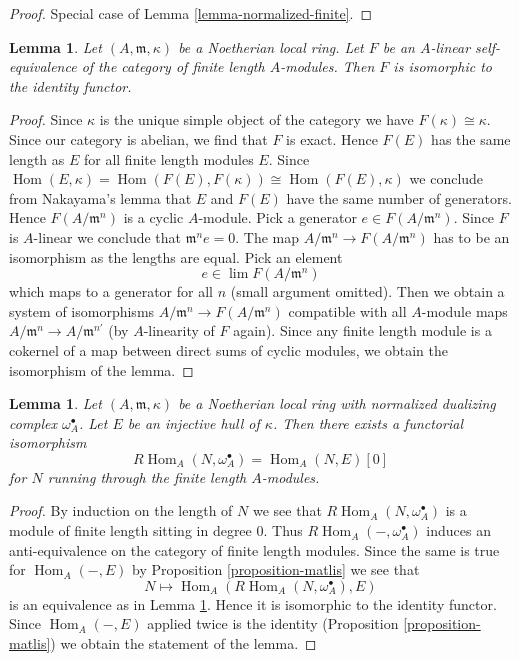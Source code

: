 \documentclass{stacks-project}
\theoremstyle{plain}
\newtheorem{lemma}[subsection]{Lemma}
\theoremstyle{definition}
\theoremstyle{remark}
\numberwithin{equation}{subsection}
\def\lim{\mathop{\mathrm{lim}}\nolimits}
\def\Hom{\mathop{\mathrm{Hom}}\nolimits}
\begin{document}
\begin{proof}
Special case of Lemma \ref{lemma-normalized-finite}.
\end{proof}

\begin{lemma}
\label{lemma-equivalence-finite-length}
Let $(A, \mathfrak m, \kappa)$ be a Noetherian local
ring. Let $F$ be an $A$-linear self-equivalence of the category of
finite length $A$-modules. Then $F$ is isomorphic to the identity functor.
\end{lemma}

\begin{proof}
Since $\kappa$ is the unique simple object of the category we have
$F(\kappa) \cong \kappa$. Since our category is abelian, we find that
$F$ is exact. Hence $F(E)$ has the same length as $E$ for all finite
length modules $E$.
Since $\Hom(E, \kappa) = \Hom(F(E), F(\kappa)) \cong \Hom(F(E), \kappa)$
we conclude from Nakayama's lemma that $E$ and $F(E)$ have the same
number of generators. Hence $F(A/\mathfrak m^n)$ is a cyclic $A$-module.
Pick a generator $e \in F(A/\mathfrak m^n)$.
Since $F$ is $A$-linear we conclude that $\mathfrak m^n e = 0$.
The map $A/\mathfrak m^n \to F(A/\mathfrak m^n)$ has to be
an isomorphism as the lengths are equal. Pick an element
$$
e \in \lim F(A/\mathfrak m^n)
$$
which maps to a generator for all $n$ (small argument omitted).
Then we obtain a system of isomorphisms
$A/\mathfrak m^n \to F(A/\mathfrak m^n)$ compatible with all
$A$-module maps $A/\mathfrak m^n \to A/\mathfrak m^{n'}$ (by $A$-linearity
of $F$ again). Since any finite length module is a cokernel
of a map between direct sums of cyclic modules, we obtain the isomorphism
of the lemma.
\end{proof}

\begin{lemma}
\label{lemma-dualizing-finite-length}
Let $(A, \mathfrak m, \kappa)$ be a Noetherian local
ring with normalized dualizing complex $\omega_A^\bullet$.
Let $E$ be an injective hull of $\kappa$. Then there exists
a functorial isomorphism
$$
R\Hom_A(N, \omega_A^\bullet) = \Hom_A(N, E)[0]
$$
for $N$ running through the finite length $A$-modules.
\end{lemma}

\begin{proof}
By induction on the length of $N$ we see that $R\Hom_A(N, \omega_A^\bullet)$
is a module of finite length sitting in degree $0$. Thus
$R\Hom_A(-, \omega_A^\bullet)$ induces an anti-equivalence
on the category of finite length modules. Since the same is true
for $\Hom_A(-, E)$ by Proposition \ref{proposition-matlis} we see that
$$
N \longmapsto \Hom_A(R\Hom_A(N, \omega_A^\bullet), E)
$$
is an equivalence as in Lemma \ref{lemma-equivalence-finite-length}.
Hence it is isomorphic to the identity functor.
Since $\Hom_A(-, E)$ applied twice is the identity
(Proposition \ref{proposition-matlis}) we obtain
the statement of the lemma.
\end{proof}
\end{document}
